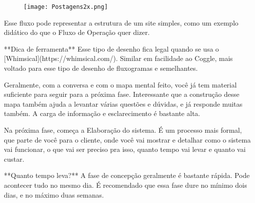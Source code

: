 \begin{figure}[H]
	\centering
	\texttt{[image: Postagens2x.png]}
\end{figure}

Esse fluxo pode representar a estrutura de um site simples, como um exemplo didático do que o Fluxo de Operação quer dizer.

**Dica de ferramenta**
Esse tipo de desenho fica legal quando se usa o [Whimsical](https://whimsical.com/). Similar em facilidade ao Coggle, mais voltado para esse tipo de desenho de fluxogramas e semelhantes.

Geralmente, com a conversa e com o mapa mental feito, você já tem material suficiente para seguir para a próxima fase. Interessante que a construção desse mapa também ajuda a levantar várias questões e dúvidas, e já responde muitas também. A carga de informação e esclarecimento é bastante alta.

Na próxima fase, começa a Elaboração do sistema. É um processo mais formal, que parte de você para o cliente, onde você vai mostrar e detalhar como o sistema vai funcionar, o que vai ser preciso pra isso, quanto tempo vai levar e quanto vai custar.

**Quanto tempo leva?**
A fase de concepção geralmente é bastante rápida. Pode acontecer tudo no mesmo dia. É recomendado que essa fase dure no mínimo dois dias, e no máximo duas semanas.